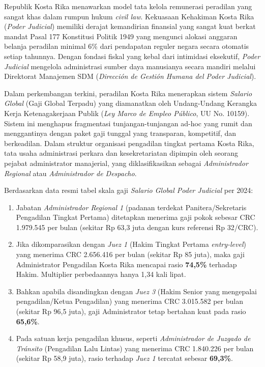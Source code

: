 \documentclass[12pt, a4paper]{article}
\begin{document}
Republik Kosta Rika menawarkan model tata kelola remunerasi peradilan yang sangat khas dalam rumpun hukum \textit{civil law}. Kekuasaan Kehakiman Kosta Rika (\textit{Poder Judicial}) memiliki derajat kemandirian finansial yang sangat kuat berkat mandat Pasal 177 Konstitusi Politik 1949 yang mengunci alokasi anggaran belanja peradilan minimal 6\% dari pendapatan reguler negara secara otomatis setiap tahunnya. Dengan fondasi fiskal yang kebal dari intimidasi eksekutif, \textit{Poder Judicial} mengelola administrasi sumber daya manusianya secara mandiri melalui Direktorat Manajemen SDM (\textit{Dirección de Gestión Humana del Poder Judicial}).

Dalam perkembangan terkini, peradilan Kosta Rika menerapkan sistem \textit{Salario Global} (Gaji Global Terpadu) yang diamanatkan oleh Undang-Undang Kerangka Kerja Ketenagakerjaan Publik (\textit{Ley Marco de Empleo Público}, UU No. 10159). Sistem ini menghapus fragmentasi tunjangan-tunjangan ad-hoc yang rumit dan menggantinya dengan paket gaji tunggal yang transparan, kompetitif, dan berkeadilan. Dalam struktur organisasi pengadilan tingkat pertama Kosta Rika, tata usaha administrasi perkara dan kesekretariatan dipimpin oleh seorang pejabat administrator manajerial, yang diklasifikasikan sebagai \textit{Administrador Regional} atau \textit{Administrador de Despacho}.

Berdasarkan data resmi tabel skala gaji \textit{Salario Global Poder Judicial} per 2024:
\begin{enumerate}
    \item Jabatan \textit{Administrador Regional 1} (padanan terdekat Panitera/Sekretaris Pengadilan Tingkat Pertama) ditetapkan menerima gaji pokok sebesar CRC 1.979.545 per bulan (sekitar Rp 63,3 juta dengan kurs referensi Rp 32/CRC).
    \item Jika dikomparasikan dengan \textit{Juez 1} (Hakim Tingkat Pertama \textit{entry-level}) yang menerima CRC 2.656.416 per bulan (sekitar Rp 85 juta), maka gaji Administrator Pengadilan Kosta Rika mencapai rasio \textbf{74,5\%} terhadap Hakim. Multiplier perbedaannya hanya 1,34 kali lipat.
    \item Bahkan apabila disandingkan dengan \textit{Juez 3} (Hakim Senior yang mengepalai pengadilan/Ketua Pengadilan) yang menerima CRC 3.015.582 per bulan (sekitar Rp 96,5 juta), gaji Administrator tetap bertahan kuat pada rasio \textbf{65,6\%}.
    \item Pada satuan kerja pengadilan khusus, seperti \textit{Administrador de Juzgado de Tránsito} (Pengadilan Lalu Lintas) yang menerima CRC 1.840.226 per bulan (sekitar Rp 58,9 juta), rasio terhadap \textit{Juez 1} tercatat sebesar \textbf{69,3\%}.
\end{enumerate}
\end{document}
